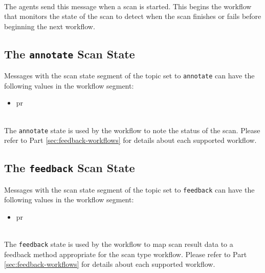 \noindent\\The \cxoneflow agents send this message when a scan is started.  This begins
the workflow that monitors the state of the scan to detect when the scan finishes
or fails before beginning the next workflow.


\subsection{The \texttt{annotate} Scan State}

Messages with the scan state segment of the topic set to \texttt{annotate} can have the following
values in the workflow segment:

\begin{itemize}
    \item pr
\end{itemize}

\noindent\\The \texttt{annotate} state is used by the workflow to note the status of the
scan.  Please refer to Part \ref{sec:feedback-workflows} for details about each supported
workflow.


\subsection{The \texttt{feedback} Scan State}

Messages with the scan state segment of the topic set to \texttt{feedback} can have the following
values in the workflow segment:

\begin{itemize}
    \item pr
\end{itemize}

\noindent\\The \texttt{feedback} state is used by the workflow to map scan result data to
a feedback method appropriate for the scan type workflow.  
Please refer to Part \ref{sec:feedback-workflows} for details about each supported workflow.
